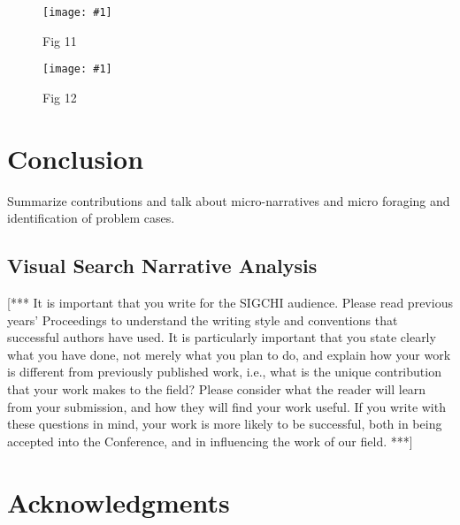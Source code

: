 \documentclass{sigchi}
\newcommand{\insertpicture}[2]{\begin{center}\texttt{[image: \#1]}\end{center}}
\begin{document}
\begin{figure}
	\insertpicture{figures/motifs.pdf}{0.5}
	\caption{Fig 11 \label{fig11}}
\end{figure}


\begin{figure}
	\insertpicture{figures/dummy.eps}{0.5}
	\caption{Fig 12\label{fig12}}
\end{figure}


					
\section{Conclusion} Summarize contributions and talk about
micro-narratives and micro foraging and identification of problem cases.

\subsection{Visual Search Narrative Analysis}


[***  It is important that you write for the SIGCHI audience.  Please read
previous years' Proceedings to understand the writing style and conventions
that successful authors have used.  It is particularly important that you
state clearly what you have done, not merely what you plan to do, and
explain how your work is different from previously published work, i.e.,
what is the unique contribution that your work makes to the field?  Please
consider what the reader will learn from your submission, and how they will
find your work useful.  If you write with these questions in mind, your
work is more likely to be successful, both in being accepted into the
Conference, and in influencing the work of our field. ***]

\section{Acknowledgments}


\pagebreak

 

 
\end{document}
